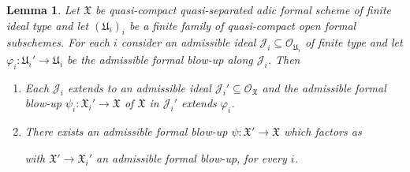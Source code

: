 \documentclass[12pt,twoside,a4paper]{article}
\newtheorem{lemma}[thm]{Lemma}
\theoremstyle{definition}
\theoremstyle{remark}
\begin{document}
\begin{lemma}\label{Admissible formal blow-up and affine opens}Let $\mathfrak{X}$ be quasi-compact quasi-separated adic formal scheme of finite ideal type and let $(\mathfrak{U}_{i})_{i}$ be a finite family of quasi-compact open formal subschemes. For each $i$ consider an admissible ideal $\mathcal{J}_{i}\subseteq \mathcal{O}_{\mathfrak{U}_{i}}$ of finite type and let $\varphi_{i}: \mathfrak{U}_{i}'\to \mathfrak{U}_{i}$ be the admissible formal blow-up along $\mathcal{J}_{i}$. Then \begin{enumerate}[(1)]\item Each $\mathcal{J}_{i}$ extends to an admissible ideal $\mathcal{J}_{i}'\subseteq \mathcal{O}_{\mathfrak{X}}$ and the admissible formal blow-up $\psi_{i}: \mathfrak{X}_{i}'\to \mathfrak{X}$ of $\mathfrak{X}$ in $\mathcal{J}_{i}'$ extends $\varphi_{i}$. \item There exists an admissible formal blow-up $\psi: \mathfrak{X}'\to \mathfrak{X}$ which factors as \begin{center}\end{center}with $\mathfrak{X}'\to \mathfrak{X}_{i}'$ an admissible formal blow-up, for every $i$.\end{enumerate}\end{lemma}
\end{document}
